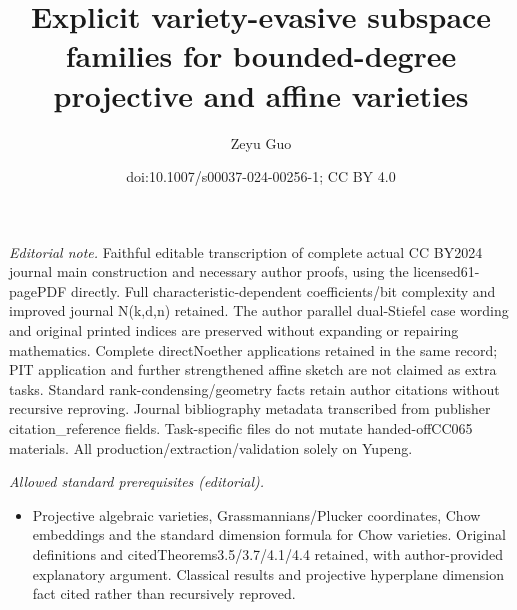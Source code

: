 \documentclass[10pt,a4paper]{article}
\title{Explicit variety-evasive subspace families for bounded-degree projective and affine varieties}
\author{Zeyu Guo}
\date{doi:10.1007/s00037-024-00256-1; CC BY 4.0}
\begin{document}
\maketitle
\noindent\textit{Editorial note.} Faithful editable transcription of complete actual CC BY2024 journal main construction and necessary author proofs, using the licensed61-pagePDF directly. Full characteristic-dependent coefficients/bit complexity and improved journal N(k,d,n) retained. The author parallel dual-Stiefel case wording and original printed indices are preserved without expanding or repairing mathematics. Complete directNoether applications retained in the same record; PIT application and further strengthened affine sketch are not claimed as extra tasks. Standard rank-condensing/geometry facts retain author citations without recursive reproving. Journal bibliography metadata transcribed from publisher citation\_reference fields. Task-specific files do not mutate handed-offCC065 materials. All production/extraction/validation solely on Yupeng.\par\medskip
\noindent\textit{Allowed standard prerequisites (editorial).}\begin{itemize}
\item Projective algebraic varieties, Grassmannians/Plucker coordinates, Chow embeddings and the standard dimension formula for Chow varieties. Original definitions and citedTheorems3.5/3.7/4.1/4.4 retained, with author-provided explanatory argument. Classical results and projective hyperplane dimension fact cited rather than recursively reproved.
\end{itemize}\medskip
\end{document}

